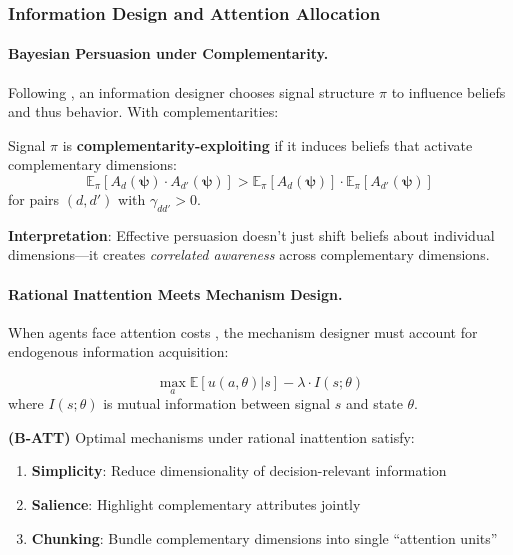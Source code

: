 \subsubsection{Information Design and Attention Allocation}

\paragraph{Bayesian Persuasion under Complementarity.}

Following \citet{kamenica2011bayesian}, an information designer chooses signal 
structure $\pi$ to influence beliefs and thus behavior. With complementarities:

\begin{definition}
\label{def:comp-persuasion}
Signal $\pi$ is \textbf{complementarity-exploiting} if it induces beliefs that 
activate complementary dimensions:
\begin{equation}
\mathbb{E}_{\pi}[A_d(\boldsymbol{\psi}) \cdot A_{d'}(\boldsymbol{\psi})] > 
\mathbb{E}_{\pi}[A_d(\boldsymbol{\psi})] \cdot \mathbb{E}_{\pi}[A_{d'}(\boldsymbol{\psi})]
\end{equation}
for pairs $(d, d')$ with $\gamma_{dd'} > 0$.
\end{definition}

\textbf{Interpretation}: Effective persuasion doesn't just shift beliefs about 
individual dimensions---it creates \emph{correlated awareness} across complementary 
dimensions.

\paragraph{Rational Inattention Meets Mechanism Design.}

When agents face attention costs \citep{sims2003implications}, the mechanism 
designer must account for endogenous information acquisition:

\begin{equation}
\max_{a} \mathbb{E}[u(a, \theta) | s] - \lambda \cdot I(s; \theta)
\end{equation}
where $I(s; \theta)$ is mutual information between signal $s$ and state $\theta$.

\begin{axiom}
\label{ax:B-ATT}
\textbf{(B-ATT)} Optimal mechanisms under rational inattention satisfy:
\begin{enumerate}
    \item \textbf{Simplicity}: Reduce dimensionality of decision-relevant information
    \item \textbf{Salience}: Highlight complementary attributes jointly
    \item \textbf{Chunking}: Bundle complementary dimensions into single ``attention units''
\end{enumerate}
\end{axiom}

